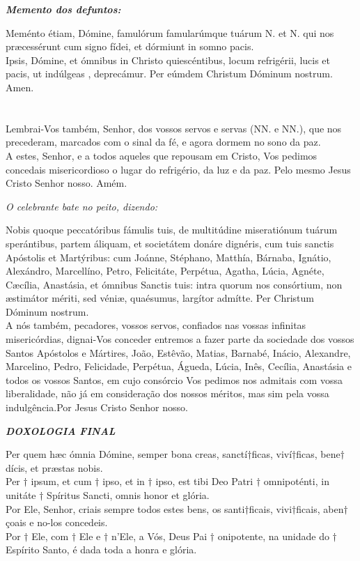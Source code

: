 \begin{flushleft}
	\textbf{\textit{Memento dos defuntos:}}
\end{flushleft}
\begin{multicols}{2}
	\noindent Meménto étiam, Dómine, famulórum famularúmque tuárum N. et N. qui nos præcessérunt cum signo fídei, et dórmiunt in somno pacis.
	\\ Ipsis, Dómine, et ómnibus in Christo
	quiescéntibus, locum refrigérii, lucis et pacis,
	ut indúlgeas , deprecámur. Per eúmdem
	Christum Dóminum nostrum. Amen.
	\\
	\\
	\\ Lembrai-Vos também, Senhor, dos vossos servos e servas (NN. e NN.), que nos precederam, marcados com o sinal da fé, e agora dormem no sono da paz. 
	\\ A estes, Senhor, e a todos aqueles que repousam em Cristo, Vos pedimos concedais misericordioso o lugar do refrigério, da luz e da paz. Pelo mesmo Jesus Cristo Senhor nosso. Amém.
\end{multicols}
\begin{flushleft}
	\textit{O celebrante bate no peito, dizendo:}
\end{flushleft}
\begin{multicols}{2}
	\noindent Nobis quoque peccatóribus fámulis tuis, de multitúdine miseratiónum tuárum sperántibus, partem áliquam, et societátem donáre dignéris, cum tuis sanctis Apóstolis et Martýribus: cum Joánne, Stéphano, Matthía, Bárnaba, Ignátio, Alexándro, Marcellíno, Petro, Felicitáte, Perpétua, Agatha, Lúcia, Agnéte, Cæcília, Anastásia, et ómnibus Sanctis tuis: intra quorum nos consórtium, non æstimátor mériti, sed véniæ, quaésumus, largítor admítte. Per Christum Dóminum nostrum.
	\\ A nós também, pecadores, vossos servos, confiados nas vossas infinitas misericórdias, dignai-Vos conceder entremos a fazer parte da sociedade dos vossos Santos Apóstolos e Mártires, João, Estêvão, Matias, Barnabé, Inácio, Alexandre, Marcelino, Pedro, Felicidade, Perpétua, Águeda, Lúcia, Inês, Cecília, Anastásia e todos os vossos Santos, em cujo consórcio Vos pedimos nos admitais com vossa liberalidade, não já em consideração dos nossos méritos, mas sim pela vossa indulgência.Por Jesus Cristo Senhor nosso.
\end{multicols}
\newpage
\begin{flushleft}
	\textbf{\textit{DOXOLOGIA FINAL}}
\end{flushleft}
\begin{multicols}{2}
	\noindent Per quem hæc ómnia Dómine, semper bona creas, sanctí$\dag$ficas, viví$\dag$ficas, bene$\dag$dícis, et præstas nobis.
	\\ Per $\dag$ ipsum, et cum $\dag$ ipso, et in $\dag$ ipso, est tibi Deo Patri $\dag$ omnipoténti, in unitáte $\dag$ Spíritus Sancti, omnis honor et glória. 
	\\ Por Ele, Senhor, criais sempre todos estes bens, os santi$\dag$ficais, vivi$\dag$ficais, aben$\dag$çoais e no-los concedeis.
	\\ Por $\dag$ Ele, com $\dag$ Ele e $\dag$ n’Ele, a Vós, Deus Pai $\dag$ onipotente, na unidade do $\dag$ Espírito Santo, é dada toda a honra e glória.
\end{multicols}